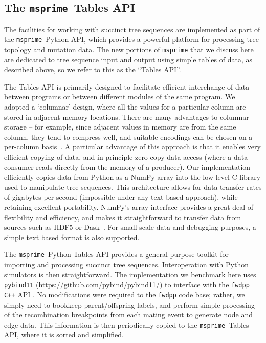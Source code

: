 \documentclass{article}
\newcommand{\fwdpp}{\texttt{fwdpp}}
\newcommand{\cpp}{\texttt{C++}}
\newcommand{\msprime}{\texttt{msprime}}
\begin{document}
\subsection*{The \msprime\ Tables API}

The facilities for working with succinct tree sequences are implemented as part
of the \msprime\ Python API, which provides a powerful platform for processing
tree topology and mutation data. The new portions of \msprime{} that we discuss
here are dedicated to tree sequence input and output using simple tables of
data, as described above, so we refer to this as the ``Tables API''.

The Tables API is primarily designed to facilitate efficient interchange of
data between programs or between different modules of the same program. We
adopted a `columnar' design, where all the values for a
particular column are stored in adjacent memory locations.
There are many advantages to columnar storage -- for example, since adjacent
values in memory are from the same column, they tend to compress well,
and suitable encodings can be chosen on a per-column basis~\citep{abadi2006integrating}.
A particular advantage of this approach is that it enables very
efficient copying of data, and in principle zero-copy data access
(where a data consumer reads directly from the memory of a producer).
Our implementation
efficiently copies data from Python as a NumPy array \citep{walt2011numpy}
into the low-level C library used to manipulate tree sequences.
This architecture allows for data transfer rates of gigabytes per second
(impossible under any text-based approach), while retaining excellent portability.
NumPy's array interface provides a great deal of flexibility and efficiency,
and makes it straightforward to transfer data from sources
such as HDF5 \citep{hdf5} or Dask~\citep{dask}.
For small scale data and debugging purposes, a simple text based format is also supported.

The \msprime\ Python Tables API provides a general purpose toolkit for importing
and processing succinct tree sequences. Interoperation with Python simulators
is then straightforward.  The implementation we benchmark here uses
\texttt{pybind11} (\url{https://github.com/pybind/pybind11/}) to interface
with the \fwdpp{} \cpp{} API \citep{fwdpp}. No modifications were
required to the \fwdpp{} code base; rather, we simply need to bookkeep parent/offspring labels,
and perform simple processing of the recombination breakpoints from each mating
event to generate node and edge data. This information is then periodically copied
to the \msprime\ Tables API, where it is sorted and simplified.
\end{document}
